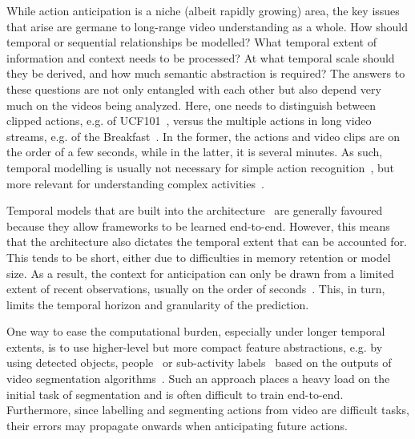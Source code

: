 \documentclass[runningheads]{llncs}
\makeatletter
\newcommand*{\eg}{e.g.\@\xspace}
\makeatother
\begin{document}
While action anticipation is a niche (albeit rapidly growing) area, the key issues that arise are germane to long-range video understanding as a whole. How should temporal or sequential relationships be modelled? What temporal extent of information and context needs to be processed? At what temporal scale should they be derived, and how much semantic abstraction is required? The answers to these questions are not only entangled with each other but also depend very much on the videos being analyzed. Here, one needs to distinguish between clipped actions, \eg of UCF101~\cite{Soomro101}, versus the multiple actions in long video streams, \eg of the Breakfast~\cite{kuehne2014language}. In the former, the actions and video clips are on the order of a few seconds, while in the latter, it is several minutes. As such, temporal modelling is usually not necessary for simple action recognition~\cite{huang2018makes}, but more relevant for understanding complex activities~\cite{richard2016temporal,sener2018unsupervised}. 

Temporal models that are built into the architecture~\cite{ding2018weakly,farha2019ms,huang2016connectionist,richard2017weakly} are generally favoured because they allow frameworks to be learned end-to-end. However, this means that the architecture also dictates the temporal extent that can be accounted for. This tends to be short, either due to difficulties in memory retention or model size. As a result, the context for anticipation can only be drawn from a limited extent of recent observations, usually on the order of seconds~\cite{lan2014hierarchical,vondrick2016anticipating,miech2019leveraging}. This, in turn, limits the temporal horizon and granularity of the prediction. 
 
One way to ease the computational burden, especially under longer temporal extents, is to use higher-level but more compact feature abstractions, \eg by using detected objects, people~\cite{lfb2019} or sub-activity labels~\cite{abu2018will,Ke_2019_CVPR} based on the outputs of video segmentation algorithms~\cite{richard2017weakly}. Such an approach places a heavy load on the initial task of segmentation and is often difficult to train end-to-end. Furthermore, since labelling and segmenting actions from video are difficult tasks, their errors may propagate onwards when anticipating future actions. 
\end{document}

